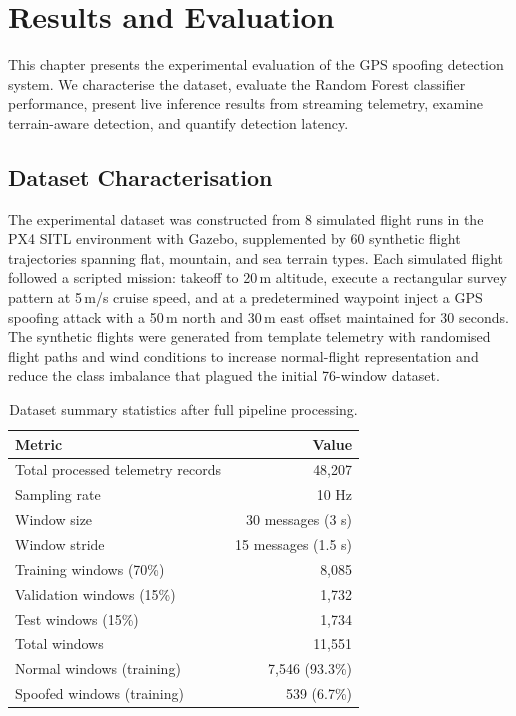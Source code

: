 \chapter{Results and Evaluation}

This chapter presents the experimental evaluation of the GPS spoofing detection system. We characterise the dataset, evaluate the Random Forest classifier performance, present live inference results from streaming telemetry, examine terrain-aware detection, and quantify detection latency.

\section{Dataset Characterisation}

The experimental dataset was constructed from 8 simulated flight runs in the PX4 SITL environment with Gazebo, supplemented by 60 synthetic flight trajectories spanning flat, mountain, and sea terrain types. Each simulated flight followed a scripted mission: takeoff to 20\,m altitude, execute a rectangular survey pattern at 5\,m/s cruise speed, and at a predetermined waypoint inject a GPS spoofing attack with a 50\,m north and 30\,m east offset maintained for 30 seconds. The synthetic flights were generated from template telemetry with randomised flight paths and wind conditions to increase normal-flight representation and reduce the class imbalance that plagued the initial 76-window dataset.

\begin{table}[H]
\centering
\caption{Dataset summary statistics after full pipeline processing.}
\label{tab:dataset}
\begin{tabular}{@{}lr@{}}
\toprule
\textbf{Metric} & \textbf{Value} \\
\midrule
Total processed telemetry records & 48,207 \\
Sampling rate & 10 Hz \\
Window size & 30 messages (3 s) \\
Window stride & 15 messages (1.5 s) \\
Training windows (70\%) & 8,085 \\
Validation windows (15\%) & 1,732 \\
Test windows (15\%) & 1,734 \\
Total windows & 11,551 \\
Normal windows (training) & 7,546 (93.3\%) \\
Spoofed windows (training) & 539 (6.7\%) \\
\bottomrule
\end{tabular}
\end{table}


